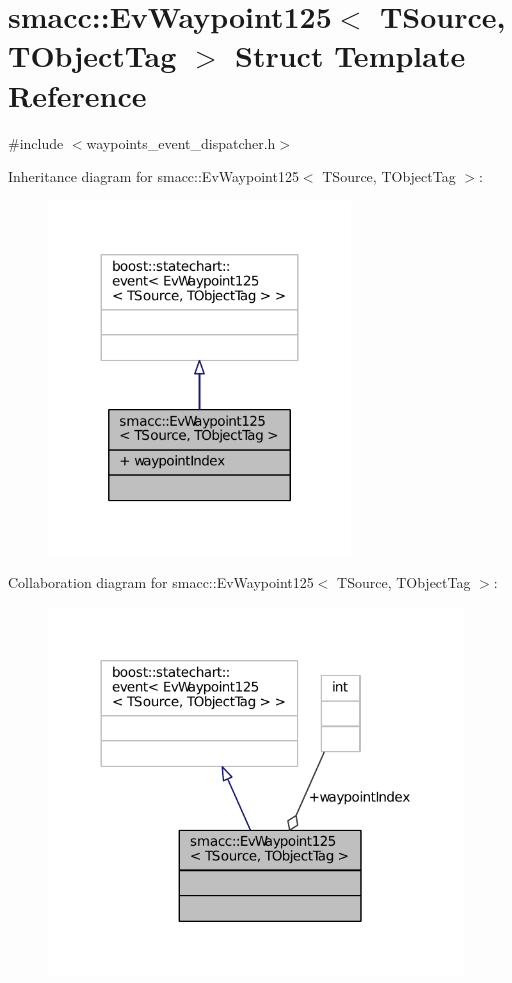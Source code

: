 \hypertarget{structsmacc_1_1EvWaypoint125}{}\section{smacc\+:\+:Ev\+Waypoint125$<$ T\+Source, T\+Object\+Tag $>$ Struct Template Reference}
\label{structsmacc_1_1EvWaypoint125}


{\ttfamily \#include $<$waypoints\+\_\+event\+\_\+dispatcher.\+h$>$}



Inheritance diagram for smacc\+:\+:Ev\+Waypoint125$<$ T\+Source, T\+Object\+Tag $>$\+:
\nopagebreak
\begin{figure}[H]
\begin{center}
\leavevmode
\includegraphics[width=227pt]{structsmacc_1_1EvWaypoint125__inherit__graph}
\end{center}
\end{figure}


Collaboration diagram for smacc\+:\+:Ev\+Waypoint125$<$ T\+Source, T\+Object\+Tag $>$\+:
\nopagebreak
\begin{figure}[H]
\begin{center}
\leavevmode
\includegraphics[width=312pt]{structsmacc_1_1EvWaypoint125__coll__graph}
\end{center}
\end{figure}
